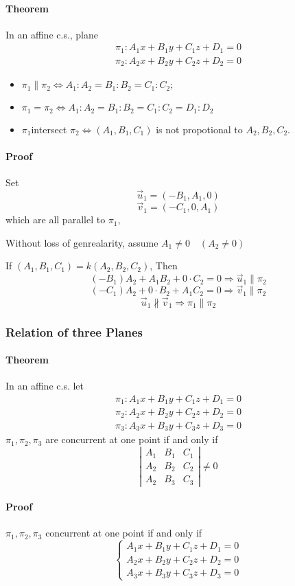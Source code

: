 \documentclass[UTF8]{ctexart}
\begin{document}
\paragraph{Theorem} In an affine c.s., plane 
$$
\begin{array}{l}
  \pi_{1}: A_{1} x+B_{1} y+C_{1} z+D_{1}=0 \\
  \pi_{2}: A_{2} x+B_{2} y+C_{2} z+D_{2}=0
  \end{array}
$$
\begin{itemize}
  \item 
    $\pi_{1} \parallel \pi_{2} \Longleftrightarrow A_{1}: A_{2}=B_{1}: B_{2}=C_{1}: C_{2} ;$
  \item $\pi_{1}=\pi_{2} \Longleftrightarrow A_{1}: A_{2}=B_{1}: B_{2}=C_{1}: C_{2}=D_{1}: D_{2}$
  \item $\pi_{1} $intersect $\pi_{2}  \iff (A_1,B_1,C_1)$ is not propotional to $A_2,B_2,C_2$.
\end{itemize}

\paragraph{Proof}
Set 
$$
\vec u_1 = (-B_1,A_1,0)
$$
$$
\vec v_1 = (-C_1,0,A_1)
$$
which are all parallel to $\pi_1$,

Without loss of genrealarity,  assume $A_1\neq 0\quad (A_2\neq 0)$

If $(A_1,B_1,C_1)=k(A_2,B_2,C_2)$, Then 
$$
(-B_1)A_2+A_1B_2+0\cdot C_2=0 \Rightarrow \vec u_1 \parallel \pi_2
$$
$$
(-C_1)A_2+0\cdot B_2+ A_1C_2=0 \Rightarrow \vec v_1 \parallel \pi_2
$$
$$
\vec u_1 \not \parallel \vec v_1 \Rightarrow \pi_1 \parallel \pi_2
$$
\subsubsection{Relation of three Planes}
\paragraph{Theorem} In an affine c.s.
let
$$
\begin{array}{l}
\pi_{1}: A_{1} x+B_{1} y+C_{1} z+D_{1}=0 \\
\pi_{2}: A_{2} x+B_{2} y+C_{2} z+D_{2}=0 \\
\pi_{3}: A_{3} x+B_{3} y+C_{3} z+D_{3}=0
\end{array}
$$
$\pi_{1}, \pi_{2}, \pi_{3}$ are concurrent at one point if and only if 
$$
\left|\begin{array}{lll}
A_{1} & B_{1} & C_{1} \\
A_{2} & B_{2} & C_{2} \\
A_{2} & B_{3} & C_{3}
\end{array}\right| \neq 0
$$
\paragraph{Proof} $\pi_{1}, \pi_{2}, \pi_{3}$ concurrent at one point 
if and only if
$$
\left\{\begin{array}{l}
A_{1} x+B_{1} y+C_{1} z+D_{1}=0 \\
A_{2} x+B_{2} y+C_{2} z+D_{2}=0 \\
A_{3} x+B_{3} y+C_{3} z+D_{3}=0
\end{array} \right.
$$
\end{document}
